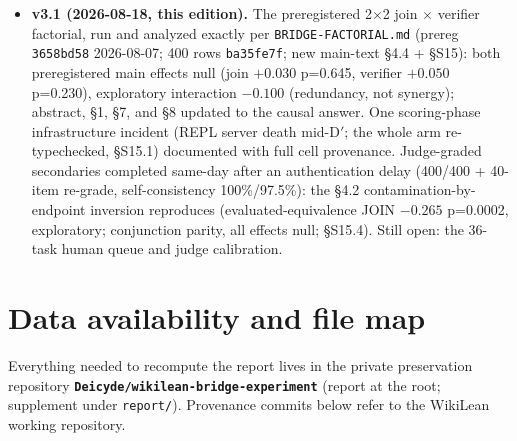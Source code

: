 \documentclass[10pt]{article}
\newcommand{\code}[1]{\texttt{#1}}
\begin{document}
\begin{itemize}
  census bases relabeled; assorted number and wording corrections
  (681, S6 fresh rates, SorryDB verdict categories, anchor
  provenance).
\item \textbf{v3.1 (2026-08-18, this edition).} The preregistered
  2$\times$2 join $\times$ verifier factorial, run and analyzed
  exactly per \code{BRIDGE-FACTORIAL.md} (prereg \code{3658bd58}
  2026-08-07; 400 rows \code{ba35fe7f}; new main-text \S 4.4 +
  \S S15): both preregistered main effects null (join $+0.030$
  p=0.645, verifier $+0.050$ p=0.230), exploratory interaction
  $-0.100$ (redundancy, not synergy); abstract, \S 1, \S 7, and
  \S 8 updated to the causal answer. One scoring-phase infrastructure
  incident (REPL server death mid-D$'$; the whole arm re-typechecked,
  \S S15.1) documented with full cell provenance. Judge-graded
  secondaries completed same-day after an authentication delay
  (400/400 + 40-item re-grade, self-consistency 100\%/97.5\%): the
  \S 4.2 contamination-by-endpoint inversion reproduces
  (evaluated-equivalence JOIN $-0.265$ p=0.0002, exploratory;
  conjunction parity, all effects null; \S S15.4). Still open: the
  36-task human queue and judge calibration.
\end{itemize}

\section{Data availability and file map}\label{s14}

Everything needed to recompute the report lives in the private
preservation repository
\textbf{\code{Deicyde/wikilean-bridge-experiment}} (report at the
root; supplement under \code{report/}). Provenance commits below refer
to the WikiLean working repository.
\end{document}
